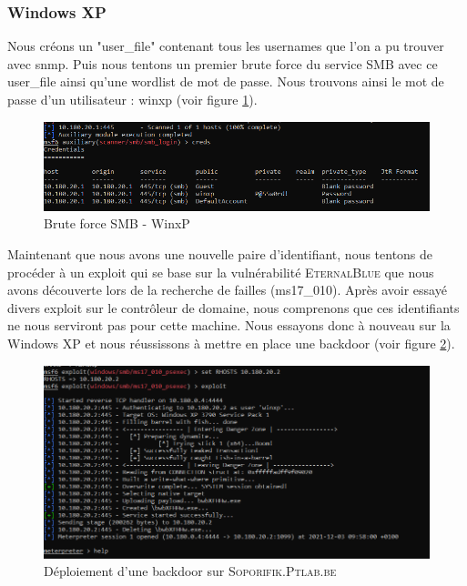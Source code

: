 \documentclass[a4paper]{article}
\begin{document}
\subsubsection{Windows XP}
Nous créons un "user\_file" contenant tous les usernames que l'on a pu trouver avec snmp. Puis nous tentons un premier brute force du service SMB avec ce user\_file ainsi qu'une wordlist de mot de passe. Nous trouvons ainsi le mot de passe d'un utilisateur : winxp (voir figure \ref{fig:firstbrute}).

\begin{figure}[H]
    \centering
    \includegraphics[width=1\textwidth]{images/lab4/brute_smb.PNG}
    \caption{Brute force SMB - WinxP}
    \label{fig:firstbrute}
\end{figure}

Maintenant que nous avons une nouvelle paire d'identifiant, nous tentons de procéder à un exploit qui se base sur la vulnérabilité \textsc{EternalBlue} que nous avons découverte lors de la recherche de failles (ms17\_010). Après avoir essayé divers exploit sur le contrôleur de domaine, nous comprenons que ces identifiants ne nous serviront pas pour cette machine. Nous essayons donc à nouveau sur la Windows XP et nous réussissons à mettre en place une backdoor (voir figure \ref{fig:meterpreter}).

\begin{figure}[H]
    \centering
    \includegraphics[width=1\textwidth]{images/lab4/meterpreter.PNG}
    \caption{Déploiement d'une backdoor sur \textsc{Soporifik.Ptlab.be}}
    \label{fig:meterpreter}
\end{figure}
\end{document}
